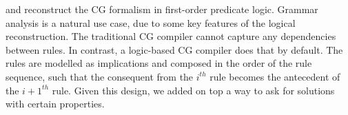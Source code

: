  and  reconstruct the CG formalism in first-order predicate logic.
Grammar analysis is a natural use case, due to some key features of the logical reconstruction.
The traditional CG compiler 
 cannot capture any dependencies between rules.
In contrast, a logic-based CG compiler does that by default. 
The rules are modelled as implications and composed in the order of the rule sequence, such that 
the consequent from the $i^{th}$ rule becomes the antecedent of the $i+1^{th}$ rule.
Given this design, we added on top a way to ask for solutions with certain properties.













